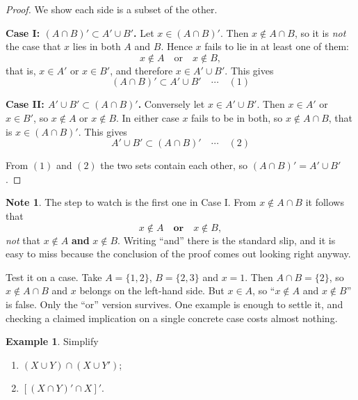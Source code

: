\documentclass[11pt,a4paper]{article}
\theoremstyle{definition}
\newtheorem{example}[thm]{Example}
\newtheorem{note}[thm]{Note}
\begin{document}
\begin{proof}
We show each side is a subset of the other.

\textbf{Case I: $(A\cap B)'\subset A'\cup B'$.} Let $x\in(A\cap B)'$. Then
$x\notin A\cap B$, so it is \emph{not} the case that $x$ lies in both $A$ and $B$.
Hence $x$ fails to lie in at least one of them:
$$x\notin A \quad \text{or}\quad  x\notin B,$$
that is, $x\in A'$ or $x\in B'$, and therefore $x\in A'\cup B'$. This gives
$$(A\cap B)'\subset A'\cup B' \quad \cdots\quad (1)$$

\textbf{Case II: $A'\cup B'\subset(A\cap B)'$.} Conversely let
$x\in A'\cup B'$. Then $x\in A'$ or $x\in B'$, so $x\notin A$ or $x\notin B$. In
either case $x$ fails to be in both, so $x\notin A\cap B$, that is
$x\in(A\cap B)'$. This gives
$$A'\cup B'\subset(A\cap B)' \quad \cdots\quad (2)$$

From $(1)$ and $(2)$ the two sets contain each other, so
$(A\cap B)'=A'\cup B'$.
\end{proof}

\begin{note}
The step to watch is the first one in Case I. From $x\notin A\cap B$ it follows
that
$$x\notin A \quad \textbf{or}\quad  x\notin B,$$
\emph{not} that $x\notin A$ \textbf{and} $x\notin B$. Writing ``and'' there is the
standard slip, and it is easy to miss because the conclusion of the proof comes
out looking right anyway.

Test it on a case. Take $A=\{1,2\}$, $B=\{2,3\}$ and $x=1$. Then $A\cap B=\{2\}$,
so $x\notin A\cap B$ and $x$ belongs on the left-hand side. But $x\in A$, so
``$x\notin A$ and $x\notin B$'' is false. Only the ``or'' version survives. One
example is enough to settle it, and checking a claimed implication on a single
concrete case costs almost nothing.
\end{note}

\begin{example}
Simplify
\begin{enumerate}
\item[(a).] $(X\cup Y)\cap(X\cup Y')$;
\item[(b).] $\left[(X\cap Y)'\cap X\right]'$.
\end{enumerate}
\end{example}
\end{document}
